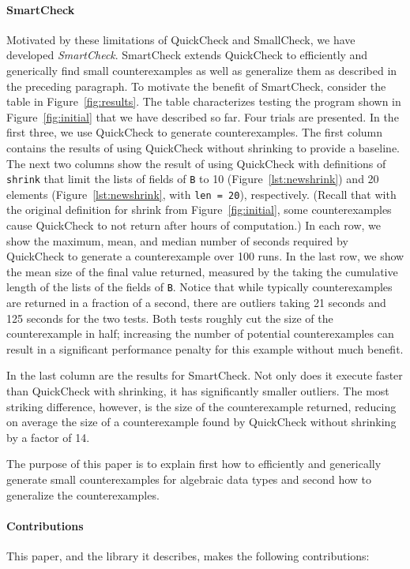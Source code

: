 \documentclass[10pt]{sigplanconf}
\newcommand{\ttp}[1]{\texttt{#1}}
\begin{document}
\paragraph{SmartCheck}
Motivated by these limitations of QuickCheck and SmallCheck, we have developed
\emph{SmartCheck}.  SmartCheck extends QuickCheck to efficiently and generically
find small counterexamples as well as generalize them as described in the
preceding paragraph.  To motivate the benefit of SmartCheck, consider the table
in Figure~\ref{fig:results}.  The table characterizes testing the program shown
in Figure~\ref{fig:initial} that we have described so far.  Four trials are
presented.  In the first three, we use QuickCheck to generate counterexamples.
The first column contains the results of using QuickCheck without shrinking to
provide a baseline.  The next two columns show the result of using QuickCheck
with definitions of \ttp{shrink} that limit the lists of fields of \ttp{B} to 10
(Figure~\ref{lst:newshrink}) and 20 elements (Figure~\ref{lst:newshrink}, with
\ttp{len = 20}), respectively.  (Recall that with the original definition for
shrink from Figure~\ref{fig:initial}, some counterexamples cause QuickCheck to
not return after hours of computation.)  In each row, we show the maximum, mean,
and median number of seconds required by QuickCheck to generate a counterexample
over 100 runs.  In the last row, we show the mean size of the final value
returned, measured by the taking the cumulative length of the lists of the
fields of \ttp{B}.  Notice that while typically counterexamples are returned in
a fraction of a second, there are outliers taking 21 seconds and 125 seconds for
the two tests.  Both tests roughly cut the size of the counterexample in half;
increasing the number of potential counterexamples can result in a significant
performance penalty for this example without much benefit.

In the last column are the results for SmartCheck.  Not only does it execute
faster than QuickCheck with shrinking, it has significantly smaller outliers.
The most striking difference, however, is the size of the counterexample
returned, reducing on average the size of a counterexample found by QuickCheck
without shrinking by a factor of 14.

The purpose of this paper is to explain first how to efficiently and generically
generate small counterexamples for algebraic data types and second how to
generalize the counterexamples.

\paragraph{Contributions}
This paper, and the library it describes, makes the following contributions:
\end{document}
